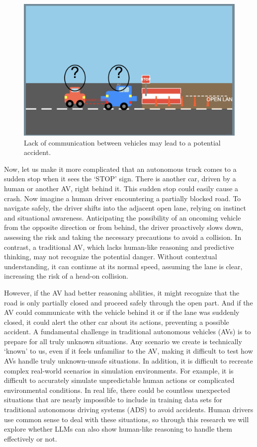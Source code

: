 \documentclass[conference]{IEEEtran}
\begin{document}
\begin{figure}[ht]
    \centering
    \includegraphics[width= \linewidth]{situation2.png}
    \caption{Lack of communication between vehicles may lead to a potential accident.}
    \label{fig:enter-label-unique-2}
\end{figure}

Now, let us make it more complicated that an autonomous truck comes to a sudden stop when it sees the `STOP' sign. There is another car, driven by a human or another AV, right behind it. This sudden stop could easily cause a crash. 
Now imagine a human driver encountering a partially blocked road. To navigate safely, the driver shifts into the adjacent open lane, relying on instinct and situational awareness. Anticipating the possibility of an oncoming vehicle from the opposite direction or from behind, the driver proactively slows down, assessing the risk and taking the necessary precautions to avoid a collision. In contrast, a traditional AV, which lacks human-like reasoning and predictive thinking, may not recognize the potential danger. Without contextual understanding, it can continue at its normal speed, assuming the lane is clear, increasing the risk of a head-on collision.

However, if the AV had better reasoning abilities, it might recognize that the road is only partially closed and proceed safely through the open part. And if the AV could communicate with the vehicle behind it or if the lane was suddenly closed, it could alert the other car about its actions, preventing a possible accident.
A fundamental challenge in traditional autonomous vehicles (AVs) is to prepare for all truly unknown situations\cite{singh2024systematic}. Any scenario we create is technically `known' to us, even if it feels unfamiliar to the AV, making it difficult to test how AVs handle truly unknown-unsafe situations. In addition, it is difficult to recreate complex real-world scenarios in simulation environments. For example, it is difficult to accurately simulate unpredictable human actions or complicated environmental conditions. In real life, there could be countless unexpected situations that are nearly impossible to include in training data sets for traditional autonomous driving systems (ADS) to avoid accidents. Human drivers use common sense to deal with these situations, so through this research we will explore whether LLMs can also show human-like reasoning to handle them effectively or not. 
\end{document}
